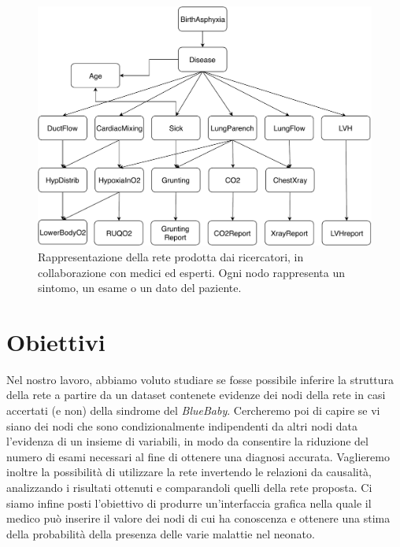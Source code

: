  \begin{figure}
 	\centering
 	\includegraphics[width=1\linewidth]{images/paper_structure}
 	\caption{Rappresentazione della rete prodotta dai ricercatori, in collaborazione con medici ed esperti. Ogni nodo rappresenta un sintomo, un esame o un dato del paziente.}
 	\label{fig:paperstructure}
 \end{figure}

\section{Obiettivi}
Nel nostro lavoro, abbiamo voluto studiare se fosse possibile inferire la struttura della rete a partire da un dataset contenete evidenze dei nodi della rete in casi accertati (e non) della sindrome del \textit{BlueBaby}. Cercheremo poi di capire se vi siano dei nodi che sono condizionalmente indipendenti da altri nodi data l'evidenza di un insieme di variabili, in modo da consentire la riduzione del numero di esami necessari al fine di ottenere una diagnosi accurata. Vaglieremo inoltre la possibilità di utilizzare la rete invertendo le relazioni da causalità, analizzando i risultati ottenuti e comparandoli quelli della rete proposta. Ci siamo infine posti l'obiettivo di produrre un'interfaccia grafica nella quale il medico può inserire il valore dei nodi di cui ha conoscenza e ottenere una stima della probabilità della presenza delle varie malattie nel neonato.